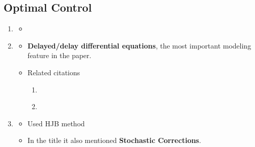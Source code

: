 \subsection{Optimal Control}
\begin{enumerate}
\item \citet{cudina2006asymptotically}
\begin{itemize}
    \item 
\end{itemize}

\item \citet{aravindakshan2015understanding}
\begin{itemize}
    \item \textbf{Delayed/delay differential equations}, the most important modeling feature in the paper.
    \item
    Related citations
    \begin{enumerate}
        \item \citet{kharatishvili1967maximum}
        \item \citet{avrani1997optimal}
    \end{enumerate}
\end{itemize}

\item \citet{avrani1997optimal}
\begin{itemize}
    \item Used HJB method
    \item In the title it also mentioned \textbf{Stochastic Corrections}.
\end{itemize}

\end{enumerate}

